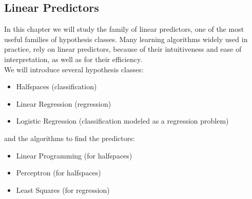 \documentclass[12pt]{report}
\theoremstyle{plain}
\begin{document}
\begin{flushleft}
\chapter{Linear Predictors}
In this chapter we will study the family of linear predictors, one of the most 
useful families of hypothesis classes. Many learning algorithms widely used in 
practice, rely on linear predictors, because of their intuitiveness and ease of 
interpretation, as well as for their efficiency.\\
We will introduce several hypothesis classes:
\begin{itemize}
	\item Halfspaces (classification)
	\item Linear Regression (regression)
	\item Logistic Regression (classification modeled as a regression problem)
\end{itemize}
and the algorithms to find the predictors:
\begin{itemize}
	\item Linear Programming (for halfspaces)
	\item Perceptron (for halfspaces)
	\item Least Squares (for regression)
\end{itemize}
  

\end{flushleft}
\end{document}
